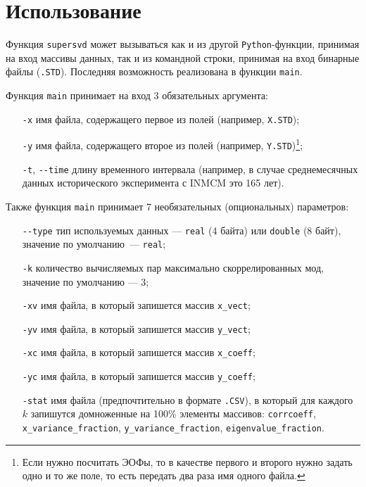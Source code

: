 \section{Использование}

Функция \texttt{supersvd} может вызываться как и из другой \texttt{Python}-функции, принимая на вход массивы данных, так и из командной строки, принимая на вход бинарные файлы (\texttt{.STD}). Последняя возможность реализована в функции \texttt{main}.

 Функция \texttt{main} принимает на вход 3 обязательных аргумента: 
 \begin{itemize}
 	\item[\texttt{-x}] имя файла, содержащего первое из полей (например, \texttt{X.STD});
 	\item[\texttt{-y}] имя файла, содержащего второе из полей  (например, \texttt{Y.STD})\footnote{Если нужно посчитать ЭОФы, то в качестве первого и второго нужно задать одно и то же поле, то есть передать два раза имя одного файла.};
 	\item[\texttt{-t}, \texttt{-{}-time}] длину временного интервала (например, в случае среднемесячных данных исторического эксперимента с INMCM это 165 лет).
 \end{itemize}
 
 Также функция \texttt{main} принимает 7 необязательных (опциональных) параметров:
 \begin{itemize}
 	\item[\texttt{-{}-type}] тип используемых данных --- \texttt{real} (4 байта) или \texttt{double} (8 байт), значение по умолчанию~--- \texttt{real};
 	\item[\texttt{-k}] количество вычисляемых пар максимально скоррелированных мод, значение по умолчанию --- 3;
 	\item[\texttt{-xv}] имя файла, в который запишется массив \texttt{x\_vect};
 	\item[\texttt{-yv}] имя файла, в который запишется массив \texttt{y\_vect};
 	\item[\texttt{-xc}] имя файла, в который запишется массив \texttt{x\_coeff};
 	\item[\texttt{-yc}] имя файла, в который запишется массив \texttt{y\_coeff};
 	\item[\texttt{-stat}] имя файла (предпочтительно в формате \texttt{.CSV}), в который для каждого $k$ запишутся домноженные на 100\% элементы массивов: \texttt{corrcoeff}, \texttt{x\_variance\_fraction}, \texttt{y\_vari\-ance\_fraction}, \texttt{eigenvalue\_fraction}. 
 \end{itemize}  

